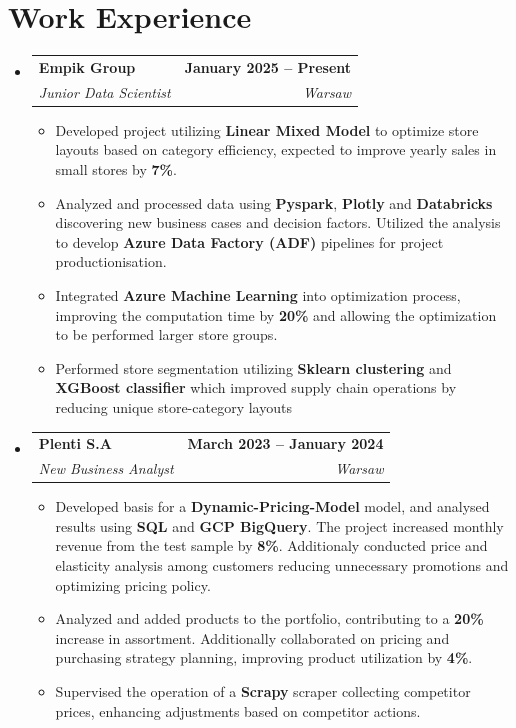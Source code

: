 \documentclass[letterpaper,11pt]{article}
\makeatletter
\newcommand{\resumeItem}[1]{
  \item\small{
    {#1 \vspace{0pt}}
  }
}
\newcommand{\resumeSubheading}[4]{
  \vspace{-2pt}\item
    \begin{tabular*}{1.0\textwidth}[t]{l@{\extracolsep{\fill}}r}
      \textbf{#1} & \textbf{\small #2} \\
      \textit{\small#3} & \textit{\small #4} \\
    \end{tabular*}\vspace{-7pt}
}
\newcommand{\resumeSubHeadingListStart}{\begin{itemize}[leftmargin=0.0in, label={}]}
\newcommand{\resumeSubHeadingListEnd}{\end{itemize}}\vspace{0pt}
\newcommand{\resumeItemListStart}{\begin{itemize}}
\newcommand{\resumeItemListEnd}{\end{itemize}\vspace{-5pt}}
\makeatother
\begin{document}
\section{Work Experience}
    \resumeSubHeadingListStart
                \resumeSubheading{Empik Group}{January 2025 --  Present}{Junior Data Scientist}{Warsaw} 
                \resumeItemListStart
                    \resumeItem{Developed project utilizing \textbf{Linear Mixed Model} to optimize store layouts based on category efficiency, expected to improve yearly sales in small stores by \textbf{7\%}.}
                    \resumeItem{Analyzed and processed data using \textbf{Pyspark}, \textbf{Plotly} and \textbf{Databricks} discovering new business cases and decision factors. Utilized the analysis to develop \textbf{Azure Data Factory (ADF)} pipelines for project productionisation.}
                    \resumeItem{Integrated \textbf{Azure Machine Learning} into optimization process, improving the computation time by \textbf{20\%} and allowing the optimization to be performed larger store groups.}
                    \resumeItem{Performed store segmentation utilizing \textbf{Sklearn clustering} and \textbf{XGBoost classifier} which improved supply chain operations by reducing unique store-category layouts}
                    \resumeItemListEnd
            \resumeSubheading{Plenti S.A}{March 2023 -- January 2024}{New Business Analyst}{Warsaw} 
                \resumeItemListStart
                    \resumeItem{Developed basis for a \textbf{Dynamic-Pricing-Model} model, and analysed results using \textbf{SQL} and \textbf{GCP BigQuery}. The project increased monthly revenue from the test sample by \textbf{8\%}. Additionaly conducted price and elasticity analysis among customers reducing unnecessary promotions and optimizing pricing policy.}
                    \resumeItem{Analyzed and added products to the portfolio, contributing to a \textbf{20\%} increase in assortment. Additionally collaborated on pricing and purchasing strategy planning, improving product utilization by \textbf{4\%}.}
                    \resumeItem{Supervised the operation of a \textbf{Scrapy} scraper collecting competitor prices, enhancing adjustments based on competitor actions.}
                    \resumeItemListEnd
    \resumeSubHeadingListEnd
    \vspace{-12pt}

\end{document}

